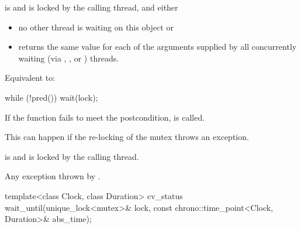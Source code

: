 \begin{itemdescr}
\pnum
\expects
{} is  and  is
locked by the calling thread, and either
\begin{itemize}
\item no other thread is waiting on this  object or
\item {} returns the same value for each of the 
arguments supplied by all concurrently waiting (via ,
, or ) threads.
\end{itemize}

\pnum
\effects
Equivalent to:
\begin{codeblock}
while (!pred())
  wait(lock);
\end{codeblock}

\pnum
\remarks
If the function fails to meet the postcondition, 
is called.
\begin{note}
This can happen if the re-locking of the mutex throws an exception.
\end{note}

\pnum
\ensures
{} is  and 
is locked by the calling thread.

\pnum
\throws
Any exception thrown by .
\end{itemdescr}

%
\begin{itemdecl}
template<class Clock, class Duration>
  cv_status wait_until(unique_lock<mutex>& lock,
                       const chrono::time_point<Clock, Duration>& abs_time);
\end{itemdecl}

